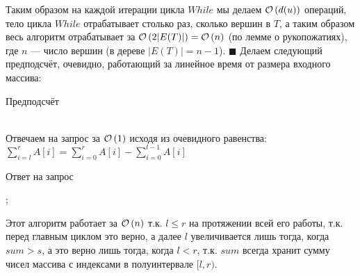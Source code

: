 Таким образом на каждой итерации цикла $While$ мы делаем $\mathcal{O}\left(d(u)\right)$ операций, тело цикла $While$ отрабатывает столько
раз, сколько вершин в $T$, а таким образом весь алгоритм отрабатывает за $\mathcal{O}\left(2|E(T)|\right)=\mathcal{O}\left(n\right)$ (по лемме о 
рукопожатиях), где $n$ --- число вершин (в дереве $|E(T)| = n - 1$). \hfill $\blacksquare$
\task{-}
Делаем следующий предподсчёт, очевидно, работающий за линейное время от размера входного массива:
\begin{algorithm}
\begin{algorithmic}[1]
\caption{Предподсчёт}
\EndFor
\end{algorithmic}
\end{algorithm}\\
Отвечаем на запрос за $\mathcal{O}\left(1\right)$ исходя из очевидного равенства: $\sum_{i = l}^{r}{A[i]} = \sum_{i=0}^{r}{A[i]}-\sum_{i=0}^{l-1}{A[i]}$
\begin{algorithm}
\begin{algorithmic}[1]
\caption{Ответ на запрос}
\end{algorithmic}
\end{algorithm}

\begin{algorithmic}[1]

		;
	\EndIf
\EndWhile
{}
\end{algorithmic}
Этот алгоритм работает за $\mathcal{O}\left(n\right)$ т.к. $l \leq r$ на протяжении всей его работы, т.к. перед главным циклом это верно,
а далее $l$ увеличивается лишь тогда, когда $sum > s$, а это верно лишь тогда, когда $l < r$, т.к. $sum$ всегда хранит
сумму чисел массива с индексами в полуинтервале $[l, r)$.


